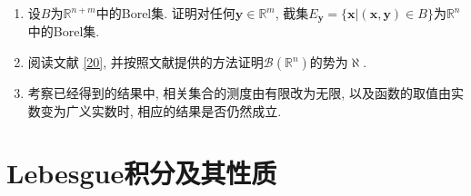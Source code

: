 \begin{quizb}
\begin{enumerate}
\item 设\(B\)为\(\mathbb{R}^{n+m}\)中的Borel集. 
证明对任何\(\boldsymbol{y}\in\mathbb{R}^m\), 
截集\(E_{\boldsymbol{y}}=\{\boldsymbol{x}\big|(\boldsymbol{x},\boldsymbol{y})\in B\}\)为\(\mathbb{R}^n\)中的Borel集.

\item 阅读文献 \href{http://link.springer.com/article/10.1007/s10474-019-00986-7}{[20]}, 并按照文献提供的方法证明\(\mathscr{B}(\mathbb{R}^n)\)的势为\(\aleph\).

\item 考察已经得到的结果中, 相关集合的测度由有限改为无限, 
以及函数的取值由实数变为广义实数时, 相应的结果是否仍然成立.
\end{enumerate}
\end{quizb}

\section{Lebesgue积分及其性质}
